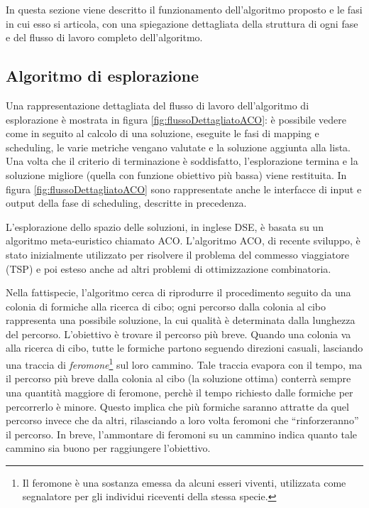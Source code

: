 In questa sezione viene descritto il funzionamento dell'algoritmo proposto e le 
fasi in cui esso si articola, con una spiegazione dettagliata della struttura 
di ogni fase e del flusso di lavoro completo dell'algoritmo.


\subsection{Algoritmo di esplorazione}
Una rappresentazione dettagliata del flusso di lavoro dell'algoritmo di
esplorazione \`e mostrata in figura \ref{fig:flussoDettagliatoACO}: \`e
possibile vedere come in seguito al calcolo di una soluzione, eseguite le fasi
di mapping e scheduling, le varie metriche vengano valutate e la soluzione
aggiunta alla lista. Una volta che il criterio di terminazione \`e soddisfatto,
l'esplorazione termina e la soluzione migliore (quella con funzione obiettivo pi\`u
bassa) viene restituita. In figura \ref{fig:flussoDettagliatoACO} sono rappresentate
anche le interfacce di input e output della fase di scheduling, descritte in precedenza.

L'esplorazione dello spazio delle soluzioni, in inglese \ac{DSE},  \`e basata su un algoritmo
meta-euristico chiamato \acf{ACO}. L'algoritmo \ac{ACO}, di recente sviluppo, è stato inizialmente 
utilizzato per risolvere il problema del commesso viaggiatore (\acs{TSP}) 
\cite{AntSystem} e poi esteso anche ad altri problemi di ottimizzazione 
combinatoria.

Nella fattispecie, l'algoritmo cerca di riprodurre il procedimento seguito da una colonia di 
formiche alla ricerca di cibo; ogni percorso dalla colonia al cibo rappresenta una possibile soluzione,
la cui qualit\`a \`e determinata dalla lunghezza del percorso. L'obiettivo
\`e trovare il percorso pi\`u breve.
Quando una colonia va alla ricerca di cibo, tutte le formiche partono
seguendo direzioni casuali, lasciando una traccia di 
\emph{feromone}\footnote{Il feromone è una sostanza emessa da alcuni esseri 
viventi, utilizzata come segnalatore per gli individui riceventi 
della stessa specie.} sul loro cammino. Tale traccia evapora con il tempo,
ma il percorso più breve dalla colonia al cibo (la soluzione ottima) conterrà 
sempre una quantit\`a maggiore di feromone, perch\`e il tempo richiesto dalle formiche
per percorrerlo \`e minore. Questo implica che pi\`u formiche saranno attratte da
quel percorso invece che da altri, rilasciando a loro volta feromoni che
``rinforzeranno'' il percorso. In breve, l'ammontare di feromoni su un cammino
indica quanto tale cammino sia buono per raggiungere l'obiettivo.

